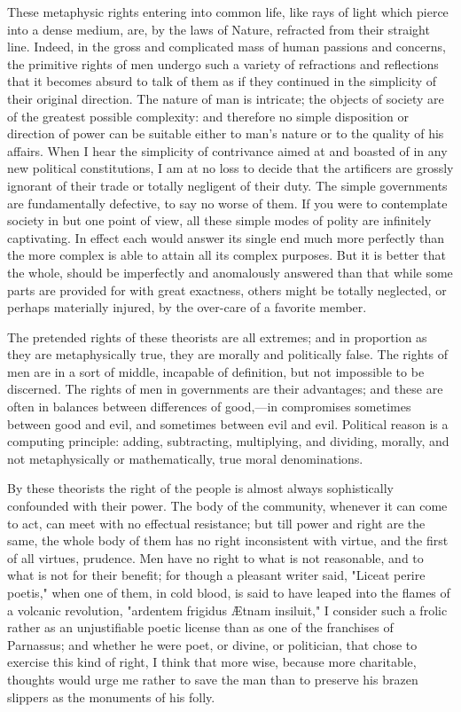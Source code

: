 These metaphysic rights entering into common life, like rays of light which pierce into a dense medium, are, by the laws of Nature, refracted from their straight line. Indeed, in the gross and complicated mass of human passions and concerns, the primitive rights of men undergo such a variety of refractions and reflections that it becomes absurd to talk of them as if they continued in the simplicity of their original direction. The nature of man is intricate; the objects of society are of the greatest possible complexity: and therefore no simple disposition or direction of power can be suitable either to man's nature or to the quality of his affairs. When I hear the simplicity of contrivance aimed at and boasted of in any new political constitutions, I am at no loss to decide that the artificers are grossly ignorant of their trade or totally negligent of their duty. The simple governments are fundamentally defective, to say no worse of them. If you were to contemplate society in but one point of view, all these simple modes of polity are infinitely captivating. In effect each would answer its single end much more perfectly than the more complex is able to attain all its complex purposes. But it is better that the whole, should be imperfectly and anomalously answered than that while some parts are provided for with great exactness, others might be totally neglected, or perhaps materially injured, by the over-care of a favorite member.

The pretended rights of these theorists are all extremes; and in proportion as they are metaphysically true, they are morally and politically false. The rights of men are in a sort of middle, incapable of definition, but not impossible to be discerned. The rights of men in governments are their advantages; and these are often in balances between differences of good,—in compromises sometimes between good and evil, and sometimes between evil and evil. Political reason is a computing principle: adding, subtracting, multiplying, and dividing, morally, and not metaphysically or mathematically, true moral denominations.

By these theorists the right of the people is almost always sophistically confounded with their power. The body of the community, whenever it can come to act, can meet with no effectual resistance; but till power and right are the same, the whole body of them has no right inconsistent with virtue, and the first of all virtues, prudence. Men have no right to what is not reasonable, and to what is not for their benefit; for though a pleasant writer said, "Liceat perire poetis," when one of them, in cold blood, is said to have leaped into the flames of a volcanic revolution, "ardentem frigidus Ætnam insiluit," I consider such a frolic rather as an unjustifiable poetic license than as one of the franchises of Parnassus; and whether he were poet, or divine, or politician, that chose to exercise this kind of right, I think that more wise, because more charitable, thoughts would urge me rather to save the man than to preserve his brazen slippers as the monuments of his folly.

